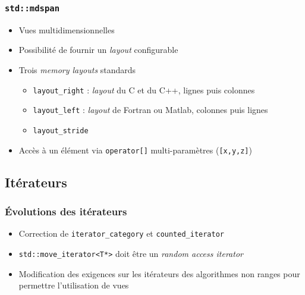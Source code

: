 \documentclass[C++.tex]{subfiles}
\begin{document}
\begin{frame}[fragile]
	\frametitle{\lstinline|std::mdspan|}
	\begin{itemize}
		\item Vues multidimensionnelles
		\item Possibilité de fournir un \textit{layout} configurable
		\item Trois \textit{memory layouts} standards
		\begin{itemize}
			\item \lstinline|layout_right| : \textit{layout} du C et du C++, lignes puis colonnes
			\item \lstinline|layout_left| : \textit{layout} de Fortran ou Matlab, colonnes puis lignes
			\item \lstinline|layout_stride| 
		\end{itemize}
		\item Accès à un élément via \lstinline|operator[]| multi-paramètres (\lstinline|[x,y,z]|)
	\end{itemize}
\end{frame}

\subsection*{Itérateurs}
\begin{frame}[fragile]
	\frametitle{Évolutions des itérateurs}
	\begin{itemize}
		\item Correction de \lstinline|iterator_category| et \lstinline|counted_iterator|
		\item \lstinline|std::move_iterator<T*>| doit être un \textit{random access iterator}
		\item Modification des exigences sur les itérateurs des algorithmes \og{}non ranges\fg{} pour permettre l'utilisation de vues
	\end{itemize}
\end{frame}
\end{document}
